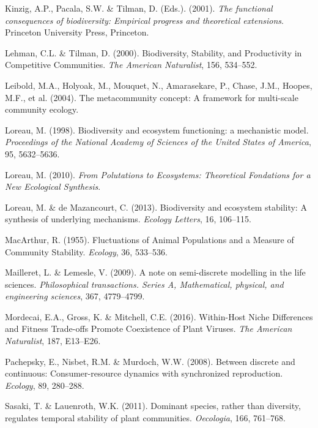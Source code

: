 \documentclass[12pt,]{article}
\begin{document}
\hypertarget{ref-Kinzig2001}{}
Kinzig, A.P., Pacala, S.W. \& Tilman, D. (Eds.). (2001). \emph{The
functional consequences of biodiversity: Empirical progress and
theoretical extensions}. Princeton University Press, Princeton.

\hypertarget{ref-Lehman2000}{}
Lehman, C.L. \& Tilman, D. (2000). Biodiversity, Stability, and
Productivity in Competitive Communities. \emph{The American Naturalist},
156, 534--552.

\hypertarget{ref-Leibold2004}{}
Leibold, M.A., Holyoak, M., Mouquet, N., Amarasekare, P., Chase, J.M.,
Hoopes, M.F., et al. (2004). The metacommunity concept: A framework for
multi-scale community ecology.

\hypertarget{ref-Loreau1998}{}
Loreau, M. (1998). Biodiversity and ecosystem functioning: a mechanistic
model. \emph{Proceedings of the National Academy of Sciences of the
United States of America}, 95, 5632--5636.

\hypertarget{ref-Loreau2010}{}
Loreau, M. (2010). \emph{From Polutations to Ecosystems: Theoretical
Fondations for a New Ecological Synthesis}.

\hypertarget{ref-Loreau2013}{}
Loreau, M. \& de Mazancourt, C. (2013). Biodiversity and ecosystem
stability: A synthesis of underlying mechanisms. \emph{Ecology Letters},
16, 106--115.

\hypertarget{ref-MacArthur1955}{}
MacArthur, R. (1955). Fluctuations of Animal Populations and a Measure
of Community Stability. \emph{Ecology}, 36, 533--536.

\hypertarget{ref-Mailleret2009}{}
Mailleret, L. \& Lemesle, V. (2009). A note on semi-discrete modelling
in the life sciences. \emph{Philosophical transactions. Series A,
Mathematical, physical, and engineering sciences}, 367, 4779--4799.

\hypertarget{ref-Mordecai2016}{}
Mordecai, E.A., Gross, K. \& Mitchell, C.E. (2016). Within-Host Niche
Differences and Fitness Trade-offs Promote Coexistence of Plant Viruses.
\emph{The American Naturalist}, 187, E13--E26.

\hypertarget{ref-Pachepsky2008}{}
Pachepsky, E., Nisbet, R.M. \& Murdoch, W.W. (2008). Between discrete
and continuous: Consumer-resource dynamics with synchronized
reproduction. \emph{Ecology}, 89, 280--288.

\hypertarget{ref-Sasaki2011}{}
Sasaki, T. \& Lauenroth, W.K. (2011). Dominant species, rather than
diversity, regulates temporal stability of plant communities.
\emph{Oecologia}, 166, 761--768.
\end{document}
